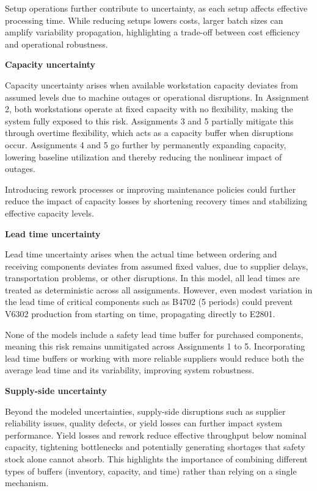 \documentclass[a4paper,faculty=eb,language=en,doctype=article,sftitles=false]{ugent-doc}
\begin{document}
Setup operations further contribute to uncertainty, as each setup affects effective processing time. While reducing setups lowers costs, larger batch sizes can amplify variability propagation, highlighting a trade-off between cost efficiency and operational robustness.

\vspace{0.5em}
\textbf{Capacity uncertainty}

Capacity uncertainty arises when available workstation capacity deviates from assumed levels due to machine outages or operational disruptions. In Assignment 2, both workstations operate at fixed capacity with no flexibility, making the system fully exposed to this risk. Assignments 3 and 5 partially mitigate this through overtime flexibility, which acts as a capacity buffer when disruptions occur. Assignments 4 and 5 go further by permanently expanding capacity, lowering baseline utilization and thereby reducing the nonlinear impact of outages.

Introducing rework processes or improving maintenance policies could further reduce the impact of capacity losses by shortening recovery times and stabilizing effective capacity levels.

\vspace{0.5em}
\textbf{Lead time uncertainty}

Lead time uncertainty arises when the actual time between ordering and receiving components deviates from assumed fixed values, due to supplier delays, transportation problems, or other disruptions. In this model, all lead times are treated as deterministic across all assignments. However, even modest variation in the lead time of critical components such as B4702 (5 periods) could prevent V6302 production from starting on time, propagating directly to E2801.

None of the models include a safety lead time buffer for purchased components, meaning this risk remains unmitigated across Assignments 1 to 5. Incorporating lead time buffers or working with more reliable suppliers would reduce both the average lead time and its variability, improving system robustness.

\vspace{0.5em}
\textbf{Supply-side uncertainty}

Beyond the modeled uncertainties, supply-side disruptions such as supplier reliability issues, quality defects, or yield losses can further impact system performance. Yield losses and rework reduce effective throughput below nominal capacity, tightening bottlenecks and potentially generating shortages that safety stock alone cannot absorb. This highlights the importance of combining different types of buffers (inventory, capacity, and time) rather than relying on a single mechanism.
\end{document}
